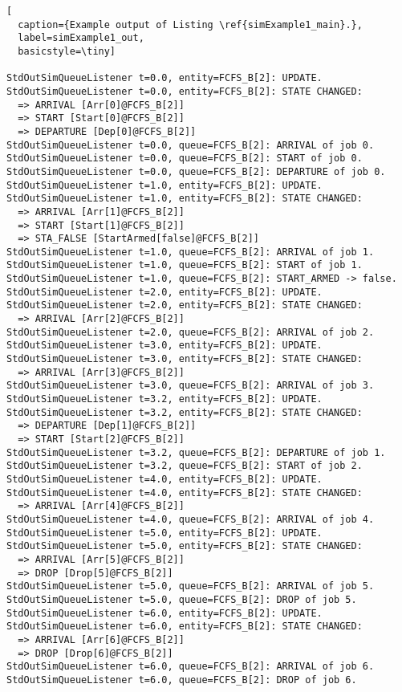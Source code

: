 \documentclass[12pt]{book}
\begin{document}
\begin{lstlisting}[
  caption={Example output of Listing \ref{simExample1_main}.},
  label=simExample1_out,
  basicstyle=\tiny]

StdOutSimQueueListener t=0.0, entity=FCFS_B[2]: UPDATE.
StdOutSimQueueListener t=0.0, entity=FCFS_B[2]: STATE CHANGED:
  => ARRIVAL [Arr[0]@FCFS_B[2]]
  => START [Start[0]@FCFS_B[2]]
  => DEPARTURE [Dep[0]@FCFS_B[2]]
StdOutSimQueueListener t=0.0, queue=FCFS_B[2]: ARRIVAL of job 0.
StdOutSimQueueListener t=0.0, queue=FCFS_B[2]: START of job 0.
StdOutSimQueueListener t=0.0, queue=FCFS_B[2]: DEPARTURE of job 0.
StdOutSimQueueListener t=1.0, entity=FCFS_B[2]: UPDATE.
StdOutSimQueueListener t=1.0, entity=FCFS_B[2]: STATE CHANGED:
  => ARRIVAL [Arr[1]@FCFS_B[2]]
  => START [Start[1]@FCFS_B[2]]
  => STA_FALSE [StartArmed[false]@FCFS_B[2]]
StdOutSimQueueListener t=1.0, queue=FCFS_B[2]: ARRIVAL of job 1.
StdOutSimQueueListener t=1.0, queue=FCFS_B[2]: START of job 1.
StdOutSimQueueListener t=1.0, queue=FCFS_B[2]: START_ARMED -> false.
StdOutSimQueueListener t=2.0, entity=FCFS_B[2]: UPDATE.
StdOutSimQueueListener t=2.0, entity=FCFS_B[2]: STATE CHANGED:
  => ARRIVAL [Arr[2]@FCFS_B[2]]
StdOutSimQueueListener t=2.0, queue=FCFS_B[2]: ARRIVAL of job 2.
StdOutSimQueueListener t=3.0, entity=FCFS_B[2]: UPDATE.
StdOutSimQueueListener t=3.0, entity=FCFS_B[2]: STATE CHANGED:
  => ARRIVAL [Arr[3]@FCFS_B[2]]
StdOutSimQueueListener t=3.0, queue=FCFS_B[2]: ARRIVAL of job 3.
StdOutSimQueueListener t=3.2, entity=FCFS_B[2]: UPDATE.
StdOutSimQueueListener t=3.2, entity=FCFS_B[2]: STATE CHANGED:
  => DEPARTURE [Dep[1]@FCFS_B[2]]
  => START [Start[2]@FCFS_B[2]]
StdOutSimQueueListener t=3.2, queue=FCFS_B[2]: DEPARTURE of job 1.
StdOutSimQueueListener t=3.2, queue=FCFS_B[2]: START of job 2.
StdOutSimQueueListener t=4.0, entity=FCFS_B[2]: UPDATE.
StdOutSimQueueListener t=4.0, entity=FCFS_B[2]: STATE CHANGED:
  => ARRIVAL [Arr[4]@FCFS_B[2]]
StdOutSimQueueListener t=4.0, queue=FCFS_B[2]: ARRIVAL of job 4.
StdOutSimQueueListener t=5.0, entity=FCFS_B[2]: UPDATE.
StdOutSimQueueListener t=5.0, entity=FCFS_B[2]: STATE CHANGED:
  => ARRIVAL [Arr[5]@FCFS_B[2]]
  => DROP [Drop[5]@FCFS_B[2]]
StdOutSimQueueListener t=5.0, queue=FCFS_B[2]: ARRIVAL of job 5.
StdOutSimQueueListener t=5.0, queue=FCFS_B[2]: DROP of job 5.
StdOutSimQueueListener t=6.0, entity=FCFS_B[2]: UPDATE.
StdOutSimQueueListener t=6.0, entity=FCFS_B[2]: STATE CHANGED:
  => ARRIVAL [Arr[6]@FCFS_B[2]]
  => DROP [Drop[6]@FCFS_B[2]]
StdOutSimQueueListener t=6.0, queue=FCFS_B[2]: ARRIVAL of job 6.
StdOutSimQueueListener t=6.0, queue=FCFS_B[2]: DROP of job 6.

\end{lstlisting}
\end{document}
